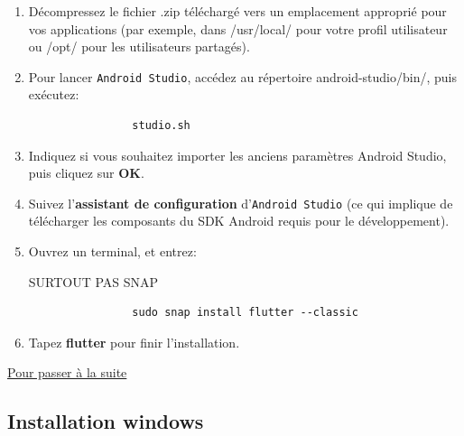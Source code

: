 \begin{enumerate}
  \item Décompressez le fichier .zip téléchargé vers un emplacement approprié pour vos applications (par exemple, dans /usr/local/ pour votre profil utilisateur ou /opt/ pour les utilisateurs partagés).\\

  \item Pour lancer \texttt{Android Studio}, accédez au répertoire android-studio/bin/, puis exécutez:

    \vspace{0.3cm}
    \begin{lstlisting}
                studio.sh
    \end{lstlisting}
    \vspace{0.2cm}

  \item Indiquez si vous souhaitez importer les anciens paramètres Android Studio, puis cliquez sur \textbf{OK}.\\

  \item Suivez l'\textbf{assistant de configuration} d'\texttt{Android Studio} (ce qui implique de télécharger les composants du SDK Android requis pour le développement).\\

  \item Ouvrez un terminal, et entrez:

    SURTOUT PAS SNAP
    \begin{lstlisting}
                sudo snap install flutter --classic
    \end{lstlisting}

  \item Tapez \textbf{flutter} pour finir l'installation.

\end{enumerate}

\bigskip

\hyperref[sec:suite_installation]{Pour passer à la suite}
\newpage

\subsection[Installation Windows]{Installation windows \label{sec:installation_windows}}

